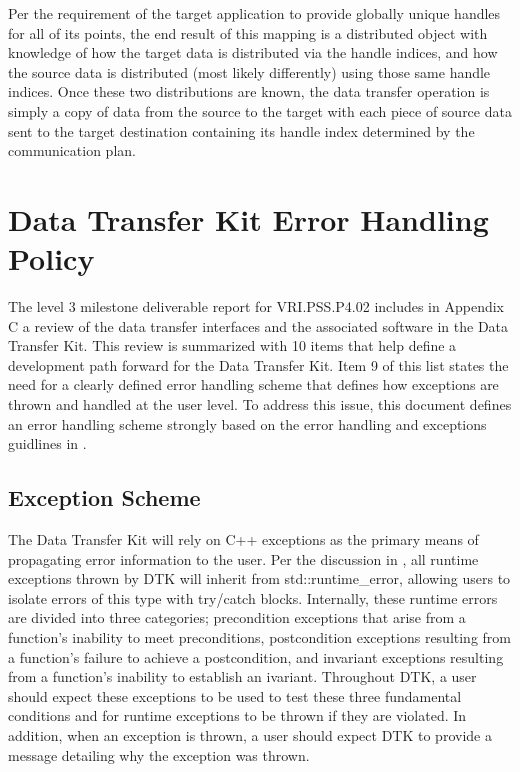 \documentclass[letterpaper]{article}
\begin{document}
Per the requirement of the target application to provide globally
unique handles for all of its points, the end result of this mapping
is a distributed object with knowledge of how the target data is
distributed via the handle indices, and how the source
data is distributed (most likely differently) using those same handle
indices. Once these two distributions are known, the data transfer
operation is simply a copy of data from the source to the target with
each piece of source data sent to the target destination containing
its handle index determined by the communication plan. 

\section{Data Transfer Kit Error Handling Policy}
The level 3 milestone deliverable report for VRI.PSS.P4.02 includes in
Appendix C a review of the data transfer interfaces and the associated
software in the Data Transfer Kit. This review is summarized with 10
items that help define a development path forward for the Data
Transfer Kit. Item 9 of this list states the need for a clearly
defined error handling scheme that defines how exceptions are thrown
and handled at the user level. To address this issue, this document
defines an error handling scheme strongly based on the error handling
and exceptions guidlines in \cite{Sutter_2004}.

\subsection{Exception Scheme}
The Data Transfer Kit will rely on C++ exceptions as the
primary means of propagating error information to the user. Per the
discussion in \cite{Sutter_2004}, all runtime exceptions thrown by DTK
will inherit from std::runtime\_error, allowing users to isolate
errors of this type with try/catch blocks. Internally, these runtime
errors are divided into three categories; precondition exceptions that
arise from a function's inability to meet preconditions, postcondition
exceptions resulting from a function's failure to achieve a
postcondition, and invariant exceptions resulting from a function's
inability to establish an ivariant. Throughout DTK, a user should
expect these exceptions to be used to test these three fundamental
conditions and for runtime exceptions to be thrown if they are
violated. In addition, when an exception is thrown, a user should
expect DTK to provide a message detailing why the exception was
thrown.
\end{document}
